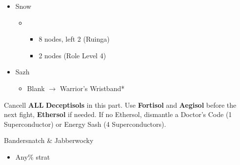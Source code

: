 \begin{menu}
\begin{itemize}
\begin{itemize}
\begin{itemize}
\begin{itemize}
						\end{itemize}
				\end{itemize}
			\item Snow
				\begin{itemize}
					\item \com
						\begin{itemize}
							\item 8 nodes, left 2 (Ruinga)
							\item 2 nodes (Role Level 4)
						\end{itemize}
				\end{itemize}
		\end{itemize}
		\equip
		\begin{itemize}
			\item Sazh
				\begin{itemize}
					\item Blank $\rightarrow$ Warrior's Wristband*
				\end{itemize}
		\end{itemize}
	\end{itemize}
\end{menu}

Cancell \textbf{ALL} \textbf{Deceptisols} in this part.
Use \textbf{Fortisol} and \textbf{Aegisol} before the next fight, \textbf{Ethersol} if needed. If no Ethersol, dismantle a Doctor's Code (1 Superconductor) or Energy Sash (4 Superconductors).

\begin{battle}{Bandersnatch \& Jabberwocky}
	\begin{itemize}
		\item Any\% strat
	\end{itemize}
\end{battle}


